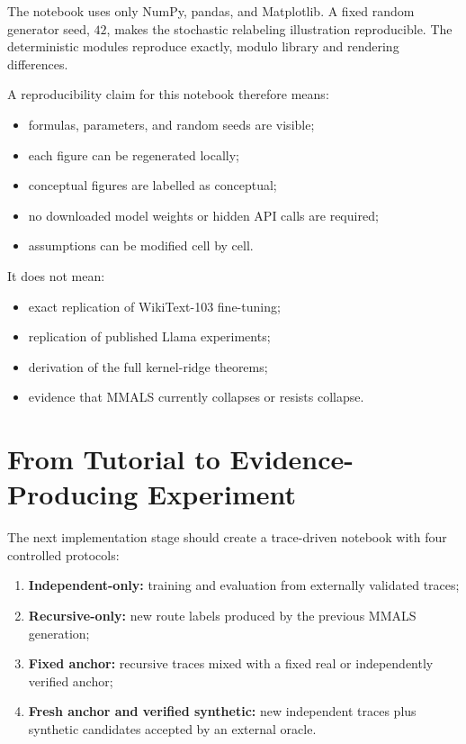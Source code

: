 \documentclass[10pt]{article}
\begin{document}
The notebook uses only NumPy, pandas, and Matplotlib. A fixed random generator seed, $42$, makes the stochastic relabeling illustration reproducible. The deterministic modules reproduce exactly, modulo library and rendering differences.

A reproducibility claim for this notebook therefore means:
\begin{itemize}[leftmargin=*]
  \item formulas, parameters, and random seeds are visible;
  \item each figure can be regenerated locally;
  \item conceptual figures are labelled as conceptual;
  \item no downloaded model weights or hidden API calls are required;
  \item assumptions can be modified cell by cell.
\end{itemize}

It does not mean:
\begin{itemize}[leftmargin=*]
  \item exact replication of WikiText-103 fine-tuning;
  \item replication of published Llama experiments;
  \item derivation of the full kernel-ridge theorems;
  \item evidence that MMALS currently collapses or resists collapse.
\end{itemize}

\section{From Tutorial to Evidence-Producing Experiment}

The next implementation stage should create a trace-driven notebook with four controlled protocols:
\begin{enumerate}[leftmargin=*]
  \item \textbf{Independent-only:} training and evaluation from externally validated traces;
  \item \textbf{Recursive-only:} new route labels produced by the previous MMALS generation;
  \item \textbf{Fixed anchor:} recursive traces mixed with a fixed real or independently verified anchor;
  \item \textbf{Fresh anchor and verified synthetic:} new independent traces plus synthetic candidates accepted by an external oracle.
\end{enumerate}
\end{document}
